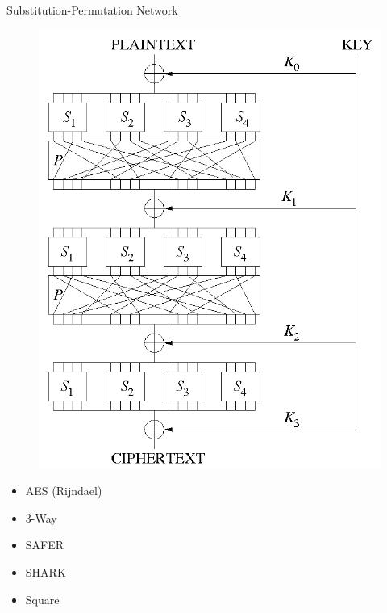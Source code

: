 \documentclass{beamer}
\begin{document}
\begin{frame}{Substitution-Permutation Network}
	\begin{minipage}{0.4\textwidth}
		\begin{figure}[h!]
			\centering
			\includegraphics[width=\textwidth,height=0.8\textheight,keepaspectratio]{spn}
		\end{figure}
	\end{minipage}
	\begin{minipage}{0.4\textwidth}
		\begin{itemize}
			\item AES (Rijndael)
			\item 3-Way
			\item SAFER
			\item SHARK
			\item Square
		\end{itemize}
	\end{minipage}
\end{frame}
\end{document}
